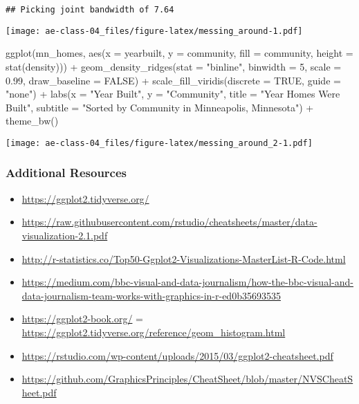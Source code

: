 \documentclass[
]{article}
\newenvironment{Shaded}{\begin{snugshade}}{\end{snugshade}}
\newcommand{\AttributeTok}[1]{\textcolor[rgb]{0.77,0.63,0.00}{#1}}
\newcommand{\ConstantTok}[1]{\textcolor[rgb]{0.00,0.00,0.00}{#1}}
\newcommand{\DecValTok}[1]{\textcolor[rgb]{0.00,0.00,0.81}{#1}}
\newcommand{\FloatTok}[1]{\textcolor[rgb]{0.00,0.00,0.81}{#1}}
\newcommand{\FunctionTok}[1]{\textcolor[rgb]{0.00,0.00,0.00}{#1}}
\newcommand{\NormalTok}[1]{#1}
\newcommand{\SpecialCharTok}[1]{\textcolor[rgb]{0.00,0.00,0.00}{#1}}
\newcommand{\StringTok}[1]{\textcolor[rgb]{0.31,0.60,0.02}{#1}}
\providecommand{\tightlist}{%
  \setlength{\itemsep}{0pt}\setlength{\parskip}{0pt}}
\begin{document}
\begin{verbatim}
## Picking joint bandwidth of 7.64
\end{verbatim}

\texttt{[image: ae-class-04\_files/figure-latex/messing\_around-1.pdf]}

\begin{Shaded}
\begin{Highlighting}[]
\FunctionTok{ggplot}\NormalTok{(mn\_homes, }\FunctionTok{aes}\NormalTok{(}\AttributeTok{x =}\NormalTok{ yearbuilt, }\AttributeTok{y =}\NormalTok{ community, }\AttributeTok{fill =}\NormalTok{ community,}
                     \AttributeTok{height =} \FunctionTok{stat}\NormalTok{(density))) }\SpecialCharTok{+}
  \FunctionTok{geom\_density\_ridges}\NormalTok{(}\AttributeTok{stat =} \StringTok{"binline"}\NormalTok{, }\AttributeTok{binwidth =} \DecValTok{5}\NormalTok{, }\AttributeTok{scale =} \FloatTok{0.99}\NormalTok{,}
                      \AttributeTok{draw\_baseline =} \ConstantTok{FALSE}\NormalTok{) }\SpecialCharTok{+}
  \FunctionTok{scale\_fill\_viridis}\NormalTok{(}\AttributeTok{discrete =} \ConstantTok{TRUE}\NormalTok{, }\AttributeTok{guide =} \StringTok{"none"}\NormalTok{) }\SpecialCharTok{+}
  \FunctionTok{labs}\NormalTok{(}\AttributeTok{x =} \StringTok{"Year Built"}\NormalTok{, }\AttributeTok{y =} \StringTok{"Community"}\NormalTok{, }\AttributeTok{title =} \StringTok{"Year Homes Were Built"}\NormalTok{,}
       \AttributeTok{subtitle =} \StringTok{"Sorted by Community in Minneapolis, Minnesota"}\NormalTok{) }\SpecialCharTok{+}
  \FunctionTok{theme\_bw}\NormalTok{()}
\end{Highlighting}
\end{Shaded}

\texttt{[image: ae-class-04\_files/figure-latex/messing\_around\_2-1.pdf]}

\hypertarget{additional-resources}{%
\subsubsection{Additional Resources}\label{additional-resources}}

\begin{itemize}
\tightlist
\item
  \url{https://ggplot2.tidyverse.org/}
\item
  \url{https://raw.githubusercontent.com/rstudio/cheatsheets/master/data-visualization-2.1.pdf}
\item
  \url{http://r-statistics.co/Top50-Ggplot2-Visualizations-MasterList-R-Code.html}
\item
  \url{https://medium.com/bbc-visual-and-data-journalism/how-the-bbc-visual-and-data-journalism-team-works-with-graphics-in-r-ed0b35693535}
\item
  \url{https://ggplot2-book.org/} =
  \url{https://ggplot2.tidyverse.org/reference/geom_histogram.html}
\item
  \url{https://rstudio.com/wp-content/uploads/2015/03/ggplot2-cheatsheet.pdf}
\item
  \url{https://github.com/GraphicsPrinciples/CheatSheet/blob/master/NVSCheatSheet.pdf}
\end{itemize}
\end{document}

